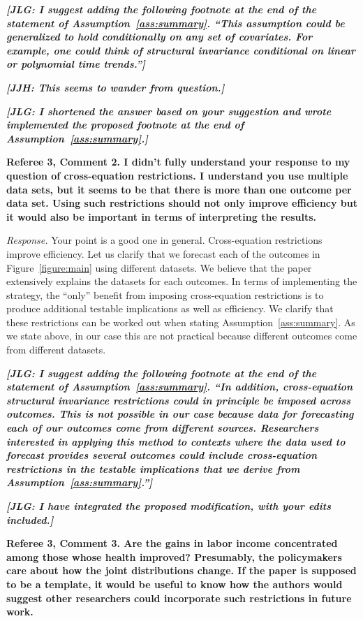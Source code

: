 \textit{\textbf{[JLG: I suggest adding the following footnote at the end of the statement of Assumption~\ref{ass:summary}. ``This assumption could be generalized to hold conditionally on any set of covariates. For example, one could think of structural invariance conditional on linear or polynomial time trends.'']}}

\textit{\textbf{[JJH: This seems to wander from question.]}}

\textit{\textbf{[JLG: I shortened the answer based on your suggestion and wrote implemented the proposed footnote at the end of  Assumption~\ref{ass:summary}.]}}

\noindent \textbf{Referee 3, Comment 2. I didn't fully understand your response to my question of cross-equation restrictions. I understand you use multiple data sets, but it seems to be that there is more than one outcome per data set. Using such restrictions should not only improve efficiency but it would also be important in terms of interpreting the results.} 

\noindent \textit{Response.} Your point is a good one in general. Cross-equation restrictions improve efficiency. Let us clarify that we forecast each of the outcomes in Figure~\ref{figure:main} using different datasets. We believe that the paper extensively explains the datasets for each outcomes. In terms of implementing the strategy, the ``only'' benefit from imposing cross-equation restrictions is to produce additional testable implications as well as efficiency. We clarify that these restrictions can be worked out when stating Assumption~\ref{ass:summary}. As we state above, in our case this are not practical because different outcomes come from different datasets. 

\textit{\textbf{[JLG: I suggest adding the following footnote at the end of the statement of Assumption~\ref{ass:summary}. ``In addition, cross-equation structural invariance restrictions could in principle be imposed across outcomes. This is not possible in our case because data for forecasting each of our outcomes come from different sources. Researchers interested in applying this method to contexts where the data used to forecast provides several outcomes could include cross-equation restrictions in the testable implications that we derive from Assumption~\ref{ass:summary}.'']}} 

\textit{\textbf{[JLG: I have integrated the proposed modification, with your edits included.]}}

\noindent \textbf{Referee 3, Comment 3. Are the gains in labor income concentrated among those whose health improved? Presumably, the policymakers care about how the joint distributions change. If the paper is supposed to be a template, it would be useful to know how the authors would suggest other researchers could incorporate such restrictions in future work.}

